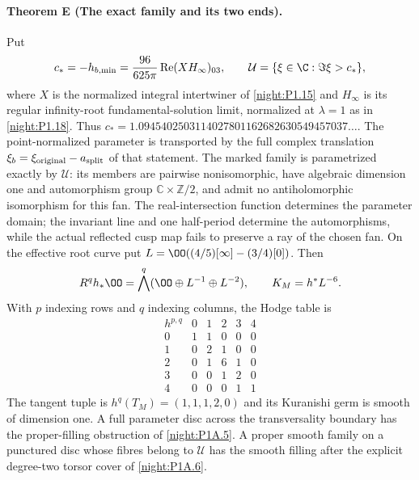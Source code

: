 \hypertarget{main-V-E}{}
\paragraph{Theorem E (The exact family and its two ends).}
\label{series:V:E}
Put
\[
 c_*=-h_{b,\min}=\frac{96}{625\pi}\operatorname{Re}(XH_\infty)_{03},
 \qquad \mathcal U=\{\xi\in\C:\Im\xi>c_*\},
\]
where $X$ is the normalized integral intertwiner of
\cref{night:P1.15} and $H_\infty$ is its regular infinity-root
fundamental-solution limit, normalized at $\lambda=1$ as in
\cref{night:P1.18}. Thus
$c_*=1.0945402503114027801162682630549457037\ldots$.
The point-normalized parameter is transported by the full complex
translation $\xi_b=\xi_{\rm original}-a_{\rm split}$ of that statement.
The marked family is parametrized exactly by $\mathcal U$:
its members are pairwise nonisomorphic, have algebraic dimension one
and automorphism group $\mathbb C\times\mathbb Z/2$, and admit no
antiholomorphic isomorphism for this fan.  The real-intersection
function determines the parameter domain; the invariant line and
one half-period determine the automorphisms, while the actual
reflected cusp map fails to preserve a ray of the chosen fan.
On the effective root curve put
$L=\OO((4/5)[\infty]-(3/4)[0])$. Then
\[
 R^qh_*\OO=\bigwedge^q(\OO\oplus L^{-1}\oplus L^{-2}),
 \qquad K_M=h^*L^{-6}.
\]
With $p$ indexing rows and $q$ indexing columns, the Hodge table is
\[
\begin{array}{c|ccccc}
h^{p,q}&0&1&2&3&4\\\hline
0&1&1&0&0&0\\
1&0&2&1&0&0\\
2&0&1&6&1&0\\
3&0&0&1&2&0\\
4&0&0&0&1&1
\end{array}
\]
The tangent tuple is $h^q(T_M)=(1,1,1,2,0)$ and its Kuranishi germ
is smooth of dimension one. A full parameter disc across the
transversality boundary has the proper-filling obstruction of
\cref{night:P1A.5}. A proper smooth family on a punctured disc
whose fibres belong to $\mathcal U$ has the smooth filling after
the explicit degree-two torsor cover of \cref{night:P1A.6}.


